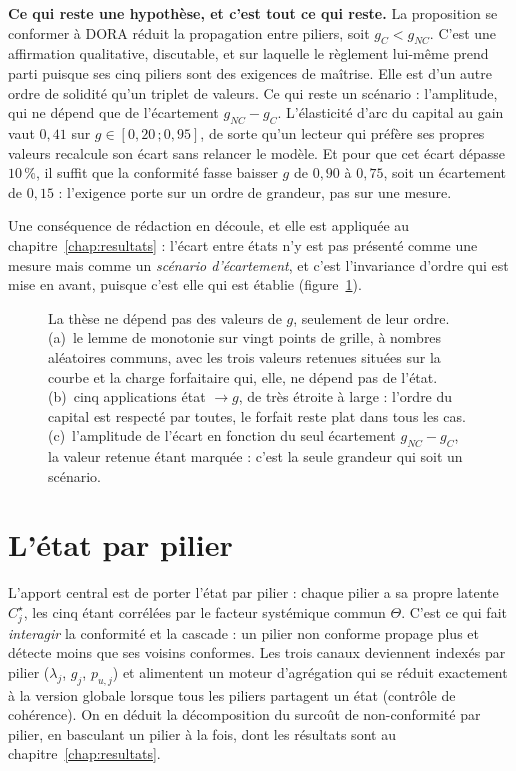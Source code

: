 \begin{cle}
\textbf{Ce qui reste une hypothèse, et c'est tout ce qui reste.} La proposition
\og se conformer à DORA réduit la propagation entre piliers\fg{}, soit $g_C < g_{NC}$. C'est
une affirmation qualitative, discutable, et sur laquelle le règlement lui-même prend parti
puisque ses cinq piliers sont des exigences de maîtrise. Elle est d'un autre ordre de solidité
qu'un triplet de valeurs. Ce qui reste un scénario : l'amplitude, qui ne dépend que de
l'écartement $g_{NC}-g_C$. L'élasticité d'arc du capital au gain vaut $0{,}41$ sur
$g \in [0{,}20\,;0{,}95]$, de sorte qu'un lecteur qui préfère ses propres valeurs recalcule son
écart sans relancer le modèle. Et pour que cet écart dépasse $10\,\%$, il suffit que la
conformité fasse baisser $g$ de $0{,}90$ à $0{,}75$, soit un écartement de $0{,}15$ : l'exigence
porte sur un ordre de grandeur, pas sur une mesure.
\end{cle}

Une conséquence de rédaction en découle, et elle est appliquée au
chapitre~\ref{chap:resultats} : l'écart entre états n'y est pas présenté comme une mesure mais
comme un \emph{scénario d'écartement}, et c'est l'invariance d'ordre qui est mise en avant,
puisque c'est elle qui est établie (figure~\ref{fig:invariance-g}).

\begin{figure}[htbp]
\centering
{}
\caption{La thèse ne dépend pas des valeurs de $g$, seulement de
leur ordre. (a)~le lemme de monotonie sur vingt points de grille, à nombres aléatoires
communs, avec les trois valeurs retenues situées sur la courbe et la charge forfaitaire qui,
elle, ne dépend pas de l'état. (b)~cinq applications état $\to g$, de très étroite à
large : l'ordre du capital est respecté par toutes, le forfait reste plat dans tous les cas.
(c)~l'amplitude de l'écart en fonction du seul écartement $g_{NC}-g_C$, la valeur
retenue étant marquée : c'est la seule grandeur qui soit un scénario.}
\label{fig:invariance-g}
\end{figure}

\section{L'état par pilier}

L'apport central est de porter l'état par pilier : chaque pilier a sa propre latente
$C^\star_j$, les cinq étant corrélées par le facteur systémique commun $\Theta$. C'est ce qui
fait \emph{interagir} la conformité et la cascade : un pilier non conforme propage plus et
détecte moins que ses voisins conformes. Les trois canaux deviennent indexés par pilier
($\lambda_j$, $g_j$, $p_{u,j}$) et alimentent un moteur d'agrégation qui se réduit exactement à
la version globale lorsque tous les piliers partagent un état (contrôle de cohérence). On en
déduit la décomposition du surcoût de non-conformité par pilier, en basculant un pilier
à la fois, dont les résultats sont au chapitre~\ref{chap:resultats}.

